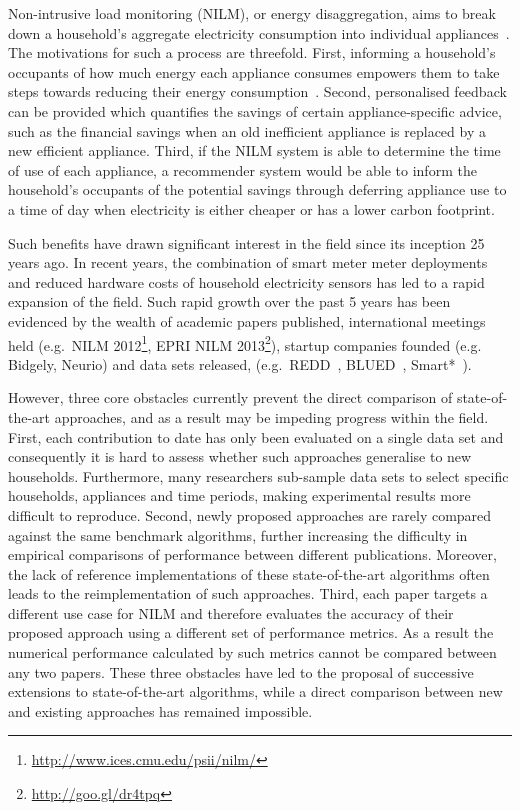 \documentclass{sig-alternate}
\begin{document}
\noindent
Non-intrusive load monitoring (NILM), or energy disaggregation, aims to break down a household's aggregate electricity consumption into individual appliances~\cite{hart_1992}. The motivations for such a process are threefold. First, informing a household's occupants of how much energy each appliance consumes empowers them to take steps towards reducing their energy consumption~\cite{darby_2006}. Second, personalised feedback can be provided which quantifies the savings of certain appliance-specific advice, such as the financial savings when an old inefficient appliance is replaced by a new efficient appliance. Third, if the NILM system is able to determine the time of use of each appliance, a recommender system would be able to inform the household's occupants of the potential savings through deferring appliance use to a time of day when electricity is either cheaper or has a lower carbon footprint. %

Such benefits have drawn significant interest in the field since its inception 25 years ago. In recent years, the combination of smart meter meter deployments~\cite{CaliforniaPublicUtilitiesCommission2006,DepartmentofEnergy&ClimateChange2013} and reduced hardware costs of household electricity sensors has led to a rapid expansion of the field. Such rapid growth over the past 5 years has been evidenced by the wealth of academic papers published, international meetings held (e.g.\ NILM 2012\footnote{\url{http://www.ices.cmu.edu/psii/nilm/}}, EPRI NILM 2013\footnote{\url{http://goo.gl/dr4tpq}}), startup companies founded (e.g. Bidgely, Neurio) and data sets released, (e.g.\ REDD~\cite{redd}, BLUED~\cite{blued}, Smart*~\cite{smart}).

However, three core obstacles currently prevent the direct comparison of state-of-the-art approaches, and as a result may be impeding progress within the field. First, each contribution to date has only been evaluated on a single data set and consequently it is hard to assess whether such approaches generalise to new households. Furthermore, many researchers sub-sample data sets to select specific households, appliances and time periods, making experimental results more difficult to reproduce. Second, newly proposed approaches are rarely compared against the same benchmark algorithms, further increasing the difficulty in empirical comparisons of performance between different publications. Moreover, the lack of reference implementations of these state-of-the-art algorithms often leads to the reimplementation of such approaches. Third, each paper targets a different use case for NILM and therefore evaluates the accuracy of their proposed approach using a different set of performance metrics. As a result the numerical performance calculated by such metrics cannot be compared between any two papers. These three obstacles have led to the proposal of successive extensions to state-of-the-art algorithms, while a direct comparison between new and existing approaches has remained impossible.
\end{document}
